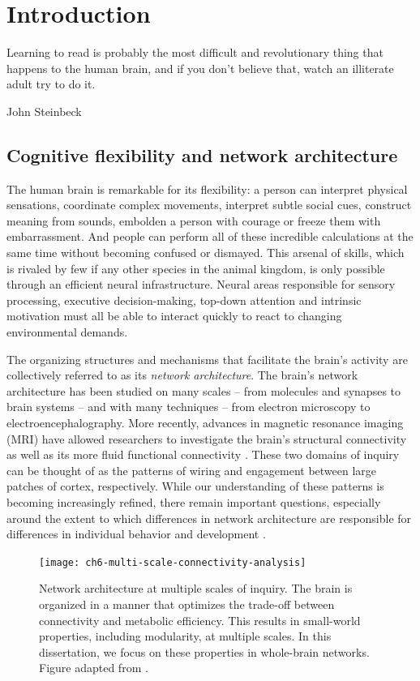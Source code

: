 \chapter{Introduction}

\epigraph{Learning to read is probably the most difficult and revolutionary thing that happens to the human brain, and if you don't believe that, watch an illiterate adult try to do it.}{John Steinbeck}

\section{Cognitive flexibility and network architecture}

The human brain is remarkable for its flexibility: a person can interpret physical sensations, coordinate complex movements, interpret subtle social cues, construct meaning from sounds, embolden a person with courage or freeze them with embarrassment. And people can perform all of these incredible calculations at the same time without becoming confused or dismayed. This arsenal of skills, which is rivaled by few if any other species in the animal kingdom, is only possible through an efficient neural infrastructure. Neural areas responsible for sensory processing, executive decision-making, top-down attention and intrinsic motivation must all be able to interact quickly to react to changing environmental demands. 

The organizing structures and mechanisms that facilitate the brain's activity are collectively referred to as its \textit{network architecture}. The brain's network architecture has been studied on many scales -- from molecules and synapses to brain systems -- and with many techniques -- from electron microscopy to electroencephalography. More recently, advances in magnetic resonance imaging (MRI) have allowed researchers to investigate the brain's structural connectivity as well as its more fluid functional connectivity \citep{Betzel2013}. These two domains of inquiry can be thought of as the patterns of wiring and engagement between large patches of cortex, respectively. While our understanding of these patterns is becoming increasingly refined, there remain important questions, especially around the extent to which differences in network architecture are responsible for differences in individual behavior and development \citep{Petersen2015}.

\begin{figure}[t]
	\centering
	\texttt{[image: ch6-multi-scale-connectivity-analysis]}
	\caption[Network architecture at multiple scales]{Network architecture at multiple scales of inquiry. The brain is organized in a manner that optimizes the trade-off between connectivity and metabolic efficiency. This results in small-world properties, including modularity, at multiple scales. In this dissertation, we focus on these properties in whole-brain networks. Figure adapted from \cite{Petersen2015}.}
	\label{fig:ch6-multi-scale-connectivity-analysis}
\end{figure}

